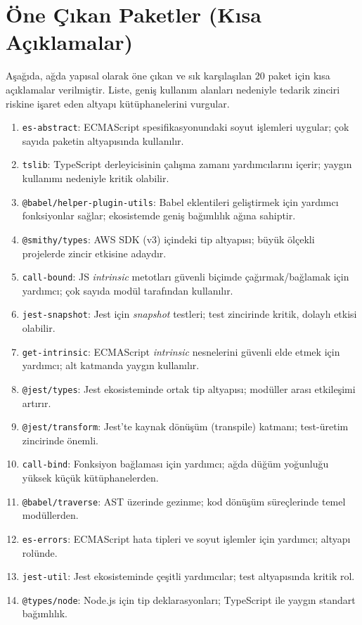 \documentclass[11pt,a4paper]{article}
\begin{document}
\section{Öne Çıkan Paketler (Kısa Açıklamalar)}
Aşağıda, ağda yapısal olarak öne çıkan ve sık karşılaşılan 20 paket için kısa açıklamalar verilmiştir. Liste, geniş kullanım alanları nedeniyle tedarik zinciri riskine işaret eden altyapı kütüphanelerini vurgular.
\begin{enumerate}
  \item \texttt{es-abstract}: ECMAScript spesifikasyonundaki soyut işlemleri uygular; çok sayıda paketin altyapısında kullanılır.
  \item \texttt{tslib}: TypeScript derleyicisinin çalışma zamanı yardımcılarını içerir; yaygın kullanımı nedeniyle kritik olabilir.
  \item \texttt{@babel/helper-plugin-utils}: Babel eklentileri geliştirmek için yardımcı fonksiyonlar sağlar; ekosistemde geniş bağımlılık ağına sahiptir.
  \item \texttt{@smithy/types}: AWS SDK (v3) içindeki tip altyapısı; büyük ölçekli projelerde zincir etkisine adaydır.
  \item \texttt{call-bound}: JS \emph{intrinsic} metotları güvenli biçimde çağırmak/bağlamak için yardımcı; çok sayıda modül tarafından kullanılır.
  \item \texttt{jest-snapshot}: Jest için \emph{snapshot} testleri; test zincirinde kritik, dolaylı etkisi olabilir.
  \item \texttt{get-intrinsic}: ECMAScript \emph{intrinsic} nesnelerini güvenli elde etmek için yardımcı; alt katmanda yaygın kullanılır.
  \item \texttt{@jest/types}: Jest ekosisteminde ortak tip altyapısı; modüller arası etkileşimi artırır.
  \item \texttt{@jest/transform}: Jest'te kaynak dönüşüm (transpile) katmanı; test-üretim zincirinde önemli.
  \item \texttt{call-bind}: Fonksiyon bağlaması için yardımcı; ağda düğüm yoğunluğu yüksek küçük kütüphanelerden.
  \item \texttt{@babel/traverse}: AST üzerinde gezinme; kod dönüşüm süreçlerinde temel modüllerden.
  \item \texttt{es-errors}: ECMAScript hata tipleri ve soyut işlemler için yardımcı; altyapı rolünde.
  \item \texttt{jest-util}: Jest ekosisteminde çeşitli yardımcılar; test altyapısında kritik rol.
  \item \texttt{@types/node}: Node.js için tip deklarasyonları; TypeScript ile yaygın standart bağımlılık.

\end{enumerate}
\end{document}
